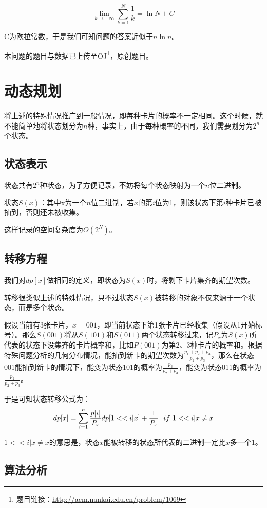 \documentclass[master]{thesis-uestc}
\begin{document}
$$
\lim_{k \to +\infty}\sum\limits_{k=1}^{N}{\frac{1}{k}}=\ln{N}+C
$$

C为欧拉常数，于是我们可知问题的答案近似于$n\ln{n}$。

本问题的题目与数据已上传至OJ\footnote{题目链接：\url{http://acm.nankai.edu.cn/problem/1069} }，原创题目。

\section{动态规划}


将上述的特殊情况推广到一般情况，即每种卡片的概率不一定相同。这个时候，就不能简单地将状态划分为$n$种，事实上，由于每种概率的不同，我们需要划分为$2^n$个状态。

\subsection{状态表示}

状态共有$2^n$种状态，为了方便记录，不妨将每个状态映射为一个$n$位二进制。

状态$S(x)$：其中x为一个$n$位二进制，若$x$的第$i$位为1，则该状态下第$i$种卡片已被抽到，否则还未被收集。

这样记录的空间复杂度为$O(2^N)$。

\subsection{转移方程}

我们对$dp[x]$做相同的定义，即状态为$S(x)$时，将剩下卡片集齐的期望次数。

转移很类似上述的特殊情况，只不过状态$S(x)$被转移的对象不仅来源于一个状态，而是多个状态。

假设当前有3张卡片，$x=001$，即当前状态下第1张卡片已经收集（假设从1开始标号）。那么$S(001)$将从$S(101)$和$S(011)$两个状态转移过来，记$P_x$为$S(x)$所代表的状态下没集齐的卡片概率和，比如$P(001)$为第2、3种卡片的概率和。根据特殊问题分析的几何分布情况，能抽到新卡的期望次数为$\frac{p_1+p_2+p_3}{p_2+p_3}$，那么在状态001能抽到新卡的情况下，能变为状态101的概率为$\frac{p_3}{p_2+p_3}$，能变为状态011的概率为$\frac{p_2}{p_2+p_3}$。

于是可知状态转移公式为：
$$
dp[x]=\sum\limits_{i=1}^n{\frac{p[i]}{P_x}\*dp[1<<i|x]+\frac{1}{P_x}\ \ if\ 1<<i|x\neq x}
$$

$1<<i|x\neq x$的意思是，状态$x$能被转移的状态所代表的二进制一定比$x$多一个1。

\subsection{算法分析}
\end{document}
